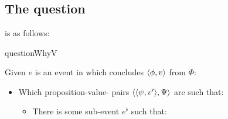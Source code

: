 \section{\qWhyV{}}
\label{cha:var:qwhyvnp}




\subsection{The question}
\label{cha:var:qwhyvnp:question}

\begin{note}
  \qWhyV{} is as follows:

  \begin{question}{questionWhyV}{\qWhyV{}}
    \medskip

    Given \(e\) is an event in which \vAgent{} concludes \(\langle \phi, v \rangle\) from \(\Phi\):

    \begin{itemize}
    \item
      Which proposition-value-\pool{} pairs \(\langle \langle \psi, v' \rangle, \Psi \rangle\) are such that:
      \begin{itemize}
      \item
        There is some sub-event \(e^{\flat}\) such that:
      \end{itemize}
    \end{itemize}
    \vspace{-1.5\baselineskip}
  \end{question}
\end{note}

